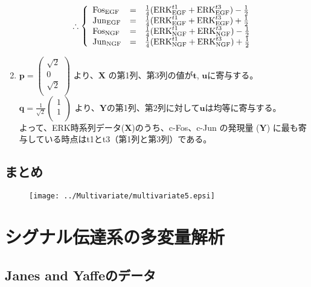 \begin{enumerate}
\[ \therefore
\left\{
\begin{array}{lll}
{\rm Fos}_{\rm EGF} & = & \frac{1}{4}( {\rm ERK}^{t1}_{\rm EGF} + {\rm ERK}^{t3}_{\rm EGF} ) - \frac{1}{2} \\
{\rm Jun}_{\rm EGF} & = & \frac{1}{4}( {\rm ERK}^{t1}_{\rm EGF} + {\rm ERK}^{t3}_{\rm EGF} ) + \frac{1}{2} \\
{\rm Fos}_{\rm NGF} & = & \frac{1}{4}( {\rm ERK}^{t1}_{\rm NGF} + {\rm ERK}^{t3}_{\rm NGF} ) - \frac{1}{2} \\
{\rm Jun}_{\rm NGF} & = & \frac{1}{4}( {\rm ERK}^{t1}_{\rm NGF} + {\rm ERK}^{t3}_{\rm NGF} ) + \frac{1}{2} \\
\end{array}
\right.
\]
\item \(
{\mathbf p} =  
\left(
\begin{array}{r}
\sqrt{2} \\
 0 \\
\sqrt{2} \\
\end{array}
\right) 
\) より、\({\mathbf X}\) の第1列、第3列の値が\({\mathbf t}\), \({\mathbf u}\)に寄与する。\\

\(
{\mathbf q} = 
\frac{1}{\sqrt{2}}
\left(
\begin{array}{r}
1 \\
1 \\
\end{array}
\right)
\) より、\({\mathbf Y}\)の第1列、第2列に対して\({\mathbf u}\)は均等に寄与する。\\
よって、ERK時系列データ(\({\mathbf X}\))のうち、c-Fos、c-Jun の発現量 (\({\mathbf Y}\)) に最も寄与している時点はt1とt3（第1列と第3列）である。
\end{enumerate}

\subsection{まとめ}
\begin{figure}[h]
\begin{center}
\texttt{[image: ../Multivariate/multivariate5.epsi]}
\end{center}
\end{figure}


\section{シグナル伝達系の多変量解析}
\subsection{Janes and Yaffeのデータ}
